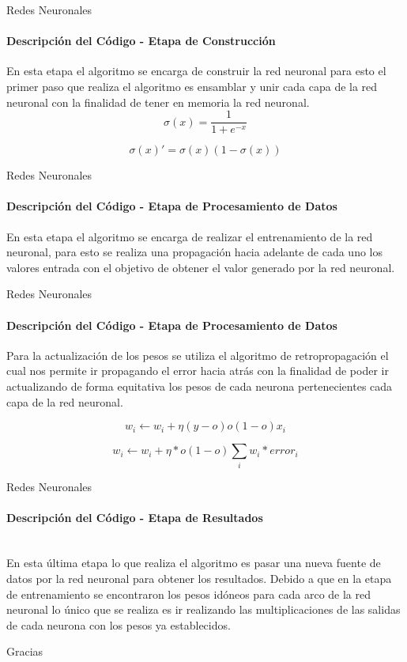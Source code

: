 \documentclass{beamer}
\begin{document}
\begin{frame}{Redes Neuronales}
\framesubtitle{Descripción del Código - Etapa de Construcción}
En esta etapa el algoritmo se encarga de construir la red neuronal para esto el primer paso que realiza el algoritmo es ensamblar y unir cada capa de la red neuronal con la finalidad de tener en memoria la red neuronal.\\

\begin{equation}
    \sigma(x) = \frac{1}{1+e^{-x}}
\end{equation}
    
\begin{equation}
    \sigma(x)' = \sigma(x)(1-\sigma(x))
\end{equation}
\end{frame}

\begin{frame}{Redes Neuronales}
\framesubtitle{Descripción del Código - Etapa de Procesamiento de Datos}

En esta etapa el algoritmo se encarga de realizar el entrenamiento de la red neuronal, para esto se realiza una propagación hacia adelante de cada uno los valores entrada con el objetivo de obtener el valor generado por la red neuronal.\\
\end{frame}

\begin{frame}{Redes Neuronales}
\framesubtitle{Descripción del Código - Etapa de Procesamiento de Datos}

Para la actualización de los pesos se utiliza el algoritmo de retropropagación el cual nos permite ir propagando el error hacia atrás con la finalidad de poder ir actualizando de forma equitativa los pesos de cada neurona pertenecientes cada capa de la red neuronal.

\begin{equation} \label{eq3}
    w_i \leftarrow w_i+\eta(y-o)o(1-o)x_i
\end{equation}          
    
\begin{equation} \label{eq4}
        w_i \leftarrow w_i+\eta*o(1-o)\sum_{i}{w_i*error_i}
\end{equation}       
\end{frame}


\begin{frame}{Redes Neuronales}
\framesubtitle{Descripción del Código - Etapa de Resultados}
\\ En esta última etapa lo que realiza el algoritmo es pasar una nueva fuente de datos por la red neuronal para obtener los resultados. Debido a que en la etapa de entrenamiento se encontraron los pesos idóneos para cada arco de la red neuronal lo único que se realiza es ir realizando las multiplicaciones de las salidas de cada neurona con los pesos ya establecidos.
\end{frame}

\begin{frame}
\huge{\centerline{Gracias}}
\end{frame}
\end{document}

